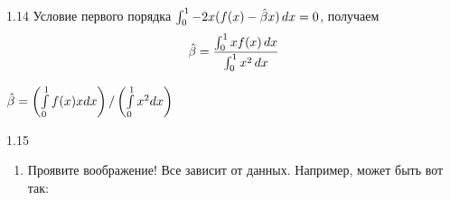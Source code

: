 \begin{solution}{{1.14}}
Условие первого порядка $\int_0^1 -2x(f(x)-\hat{\beta} x) \, dx =0$, получаем
\[
\hat{\beta} = \frac{\int_0^1 x f(x)\, dx} {\int_0^1 x^2 \, dx}
\]

\(\hat{\beta} = \left(\int \limits_0^1 f(x) x dx\right) / \left(\int \limits_0^1 x^2 dx\right)\)
\end{solution}
\protect \hypertarget {soln:1.15}{}
\begin{solution}{{1.15}}
\begin{enumerate}
\item Проявите воображение! Все зависит от данных. Например, может быть вот так:

\begin{knitrout}
\color{fgcolor}\begin{kframe}
\begin{alltt}
\hlstd{(}\hlstd{,}  \hlstd{=} \hlstd{,}  \hlstd{=} \hlstd{)}
 \hlkwb{<-} \hlstd{;}
 \hlkwb{<-} \hlstd{(}\hlstd{(}\hlstd{,} \hlstd{),} \hlopt{/}\hlopt{/}\hlstd{));}
 \hlkwb{<-} \hlstd{(} \hlopt{+} \hlopt{/}\hlstd{),} \hlopt{/}\hlstd{));}
 \hlkwb{<-}  \hlopt{*}  \hlopt{+}  \hlopt{+}   \hlstd{=} \hlstd{)}


  \hlstd{=} \hlstd{,}  \hlstd{=} \hlstd{)}
\hlstd{(x[} \hlopt{:} \hlopt{/}\hlstd{)], y[} \hlopt{:} \hlopt{/}\hlstd{)],}  \hlstd{=} \hlstd{,}
        \hlstd{=} \hlstd{,}  \hlstd{=} \hlstd{,}  \hlstd{=} \hlstd{)}
\hlstd{(x[(n}\hlopt{/} \hlopt{+} \hlstd{)} \hlopt{:} \hlstd{n], y[(n}\hlopt{/} \hlopt{+} \hlstd{)} \hlopt{:} \hlstd{n],}
        \hlstd{=} \hlstd{,}  \hlstd{=} \hlstd{,}  \hlstd{=} \hlstd{,}  \hlstd{=} \hlstd{)}


\end{alltt}
\end{kframe}
\end{knitrout}
\end{enumerate}
\end{solution}
